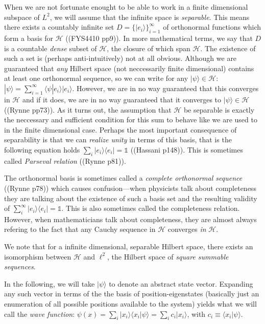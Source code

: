 \documentclass[a4paper]{article}
\begin{document}
\begin{exframe}
When we are not fortunate enought to be able to work in a finite dimensional subspace of $L^2$, we will assume that the infinite space is \emph{separable}. This means there exists a countably infinite set $D=\{|e_i\rangle\}_{i=1}^\infty$ of orthonormal functions which form a basis for $\mathcal{H}$ ((FYS4410 pp9)). In more mathematical terms, we say that $D$ is a countable \emph{dense} subset of $\mathcal H$, the closure of which span $\mathcal{H}$. The existence of such a set is (perhaps anti-intuitively)  not at all obvious. Although we are guaranteed that \emph{any} Hilbert space (not neccessarily finite dimensional) contains at least one orthonormal sequence, so we can write for any $|\psi\rangle \in \mathcal H$: $|\psi\rangle = \sum_{i=1}^\infty \langle \psi|e_i\rangle |e_i\rangle$. However, we are in no way guaranteed that this converges in $\mathcal{H}$ and if it does, we are in no way guaranteed that it converges to $|\psi\rangle\in \mathcal H$ ((Rynne pp73)). As it turns out, the assumption that $\mathcal H$ be separable is exactly the neccessary and sufficient condition for this sum to behave like we are used to in the finite dimensional case. Perhaps the most important consequence of separability is that we can \emph{realize unity} in terms of this basis, that is the following equation holds $\sum_i |e_i\rangle \langle e_i|=\mathds{1}$ ((Hassani p148)). This is sometimes called \emph{Parseval relation} ((Rynne p81)).

The orthonormal basis is sometimes called a \emph{complete orthonormal sequence} ((Rynne p78)) which causes confusion\----when physicists talk about completeness they are talking about the existence of such a basis set and the resulting validity of $\sum_i^\infty |e_i\rangle\langle e_i|=\mathds{1}$. This is also sometimes called the completeness relation. However, when mathematicians talk about completeness, they are almost always refering to the fact that any Cauchy sequence in $\mathcal{H}$ converges \emph{in} $\mathcal{H}$.

We note that for a infinite dimensional, separable Hilbert space, there exists an isomorphism between $\mathcal H$ and $\ell^2$, the Hilbert space of \emph{square summable sequences}. 

In the following, we will take $|\psi\rangle$ to denote an abstract state vector. Expanding any such vector in terms of the the basis of position-eigenstates (basically just an enumeration of all possible positions available to the system) yields what we will call the \emph{wave function}: $\psi(x)=\sum_i|x_i\rangle  \langle x_i | \psi \rangle = \sum_i c_i |x_i\rangle$, with $c_i\equiv \langle x_i|\psi\rangle$.
\end{exframe}
\end{document}

